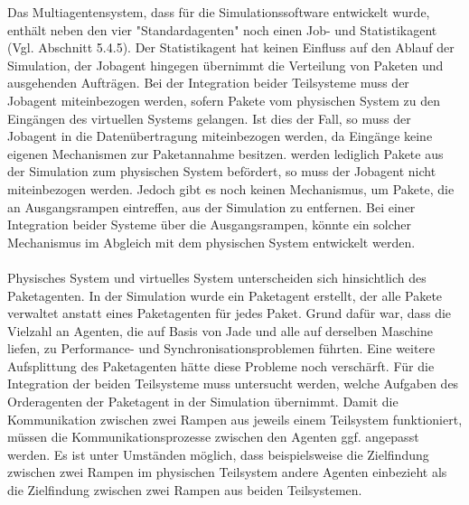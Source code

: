 Das Multiagentensystem, dass für die Simulationssoftware entwickelt wurde, enthält neben den vier "Standardagenten" noch einen Job- und Statistikagent (Vgl. Abschnitt 5.4.5). Der Statistikagent hat keinen Einfluss auf den Ablauf der Simulation, der Jobagent hingegen übernimmt die Verteilung von Paketen und ausgehenden Aufträgen. Bei der Integration beider Teilsysteme muss der Jobagent miteinbezogen werden, sofern Pakete vom physischen System zu den Eingängen des virtuellen Systems  gelangen. Ist dies der Fall, so muss der Jobagent in die Datenübertragung miteinbezogen werden, da Eingänge keine eigenen Mechanismen zur Paketannahme besitzen. werden lediglich Pakete aus der Simulation zum physischen System befördert, so muss der Jobagent nicht miteinbezogen werden. Jedoch gibt es noch keinen Mechanismus, um Pakete, die an Ausgangsrampen eintreffen, aus der Simulation zu entfernen. Bei einer Integration beider Systeme über die Ausgangsrampen, könnte ein solcher Mechanismus im Abgleich mit dem physischen System entwickelt werden. 
\\\\
Physisches System und virtuelles System unterscheiden sich hinsichtlich des Paketagenten. In der Simulation wurde ein Paketagent erstellt, der alle Pakete verwaltet anstatt eines Paketagenten für jedes Paket. Grund dafür war, dass die Vielzahl an Agenten, die auf Basis von Jade und alle auf derselben Maschine liefen, zu Performance- und Synchronisationsproblemen führten. Eine weitere Aufsplittung des Paketagenten hätte diese Probleme noch verschärft. Für die Integration der beiden Teilsysteme muss untersucht werden, welche Aufgaben des Orderagenten der Paketagent in der Simulation übernimmt. Damit die Kommunikation zwischen zwei Rampen aus jeweils einem Teilsystem funktioniert, müssen die Kommunikationsprozesse zwischen den Agenten ggf. angepasst werden. Es ist unter Umständen möglich, dass beispielsweise die Zielfindung zwischen zwei Rampen im physischen Teilsystem andere Agenten einbezieht als die Zielfindung zwischen zwei Rampen aus beiden Teilsystemen.